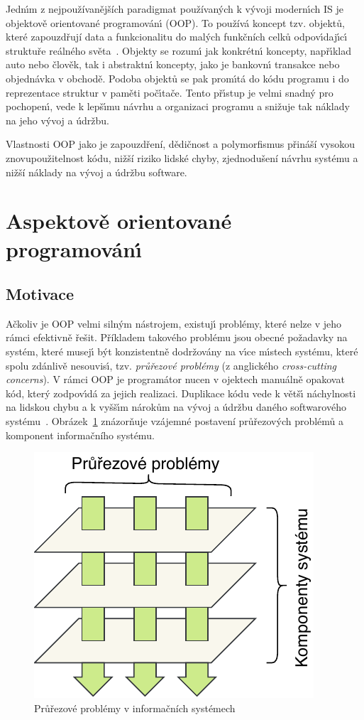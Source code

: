 Jedn\'{\i}m z nejpoužívanějších paradigmat používaných k
v\'yvoji modern\'{\i}ch \gls{IS} je objektově orientované programován\'{\i} (\gls{OOP}).
To používá koncept tzv. objektů, které zapouzdřují data a funkcionalitu do
malých funkčních celků odpov\'{\i}daj\'{\i}c\'{\i} struktuře reálného světa~\cite{rentsch1982object}.
Objekty se rozum\'{\i} jak konkrétn\'{\i} koncepty, např\'{\i}klad auto nebo člověk, tak i
abstraktn\'{\i} koncepty, jako je bankovn\'{\i} transakce nebo objednávka v obchodě.
Podoba objektů se pak prom\'{\i}tá do kódu programu i do reprezentace struktur v paměti
poč\'{\i}tače. Tento př\'{\i}stup je velmi snadn\'y pro pochopen\'{\i},
vede k lepš\'{\i}mu návrhu a organizaci programu a snižuje
tak náklady na jeho v\'yvoj a údržbu.

Vlastnosti \gls{OOP} jako je zapouzdření, dědičnost a polymorfismus přináší
vysokou znovupoužitelnost kódu, nižší riziko lidské chyby, zjednodušení
návrhu systému a nižší náklady na vývoj a údržbu software.

\section{Aspektově orientované programován\'{\i}}\label{sec:aop}

\subsection{Motivace}

Ačkoliv je \gls{OOP} velmi siln\'ym nástrojem, existuj\'{\i} problémy,
které nelze v jeho rámci efektivně řešit.
Příkladem takového problému jsou obecné požadavky na systém,
které musej\'{\i} b\'yt konzistentně dodržovány na v\'{\i}ce
m\'{\i}stech systému, které spolu zdánlivě nesouvis\'{\i},
tzv. \textit{průřezové problémy} (z anglického \textit{cross-cutting concerns}).
V rámci \gls{OOP} je programátor nucen v ojektech manuálně opakovat
kód, kter\'y zodpov\'{\i}dá za jejich realizaci. Duplikace kódu
vede k větš\'{\i} náchylnosti na lidskou chybu a k vyšš\'{\i}m nárokům na v\'yvoj
a údržbu daného softwarového systému~\cite{fowler1999refactoring}.
Obrázek~\ref{fig:cross-cutting} znázorňuje vzájemné postavení průřezových
problémů a komponent informačního systému.

\begin{figure}[t]
    \centering
    \includegraphics[keepaspectratio=true, width=0.35\linewidth]{figures/cross-cutting.pdf}
    \caption{Průřezové problémy v informačních systémech}
    \label{fig:cross-cutting}
\end{figure}

